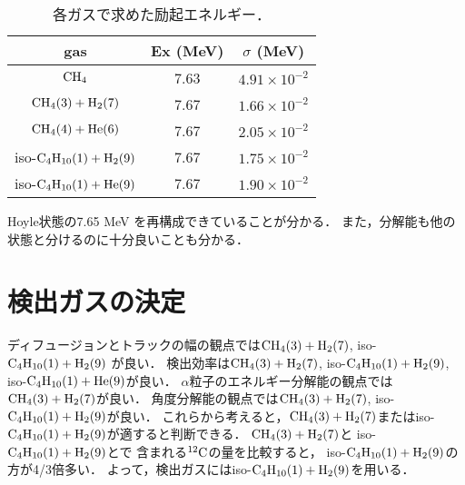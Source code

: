 \documentclass[../master]{subfiles}
\begin{document}
\begin{table}
  \centering
  \caption{各ガスで求めた励起エネルギー．}
  \label{tab::Ex_resolution}
  \begin{tabular}{ccc}
    \toprule
    gas & Ex (MeV) & $\sigma$ (MeV) \\
    \midrule
    $\rm CH_{4}$ & 7.63 & $4.91\times 10^{-2}$ \\
    $\rm CH_{4} (3) + H_{2} (7)$ & 7.67 & $1.66\times 10^{-2}$ \\
    $\rm CH_{4} (4) + He (6)$ & 7.67 & $2.05\times 10^{-2}$ \\
    iso-$\rm C_{4}H_{10} (1) + H_{2} (9)$ & 7.67 & $1.75\times 10^{-2}$ \\
    iso-$\rm C_{4}H_{10} (1) + He (9)$ & 7.67 & $1.90\times 10^{-2}$ \\
    \bottomrule
  \end{tabular}
\end{table}
Hoyle状態の7.65 MeV を再構成できていることが分かる．
また，分解能も他の状態と分けるのに十分良いことも分かる．

\section{検出ガスの決定}
ディフュージョンとトラックの幅の観点では$\rm CH_{4} (3) + H_{2} (7)$, iso-$\rm C_{4}H_{10} (1) + H_{2} (9)$ が良い．
検出効率は$\rm CH_{4} (3) + H_{2} (7)$, iso-$\rm C_{4}H_{10} (1) + H_{2} (9)$, iso-$\rm C_{4}H_{10} (1) + He (9)$が良い．
$\alpha$粒子のエネルギー分解能の観点では$\rm CH_{4} (3) + H_{2} (7)$が良い．
角度分解能の観点では$\rm CH_{4} (3) + H_{2} (7)$, iso-$\rm C_{4}H_{10} (1) + H_{2} (9)$が良い．
これらから考えると，$\rm CH_{4} (3) + H_{2} (7)$またはiso-$\rm C_{4}H_{10} (1) + H_{2} (9)$が適すると判断できる．
$\rm CH_{4} (3) + H_{2} (7)$と iso-$\rm C_{4}H_{10} (1) + H_{2} (9)$とで
含まれる${}^{12}{\rm C}$の量を比較すると，
iso-$\rm C_{4}H_{10} (1) + H_{2} (9)$の方が4/3倍多い．
よって，検出ガスにはiso-$\rm C_{4}H_{10} (1) + H_{2} (9)$を用いる．
\end{document}
